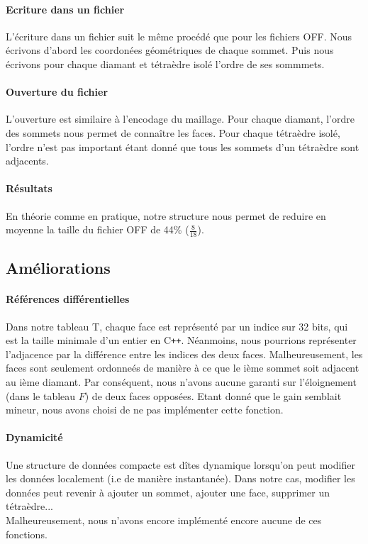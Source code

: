 \documentclass[a4paper,11pt,openany]{article}
\begin{document}
\paragraph{Ecriture dans un fichier}
L'écriture dans un fichier suit le même procédé que pour les fichiers OFF. Nous écrivons d'abord les coordonées géométriques de chaque sommet. Puis nous écrivons pour chaque diamant et tétraèdre isolé l'ordre de ses sommmets.

\paragraph{Ouverture du fichier}
L'ouverture est similaire à l'encodage du maillage. Pour chaque diamant, l'ordre des sommets nous permet de connaître les faces. Pour chaque tétraèdre isolé, l'ordre n'est pas important étant donné que tous les sommets d'un tétraèdre sont adjacents.

\paragraph{Résultats}
En théorie comme en pratique, notre structure nous permet de reduire en moyenne la taille du fichier OFF de 44\% ($\frac{8}{18}$).

\subsection{Améliorations}
\paragraph{Références différentielles}
Dans notre tableau T, chaque face est représenté par un indice sur 32 bits, qui est la taille minimale d'un entier en C\texttt{++}. Néanmoins, nous pourrions représenter l'adjacence par la différence entre les indices des deux faces. Malheureusement, les faces sont seulement ordonneés de manière à ce que le ième sommet soit adjacent au ième diamant. Par conséquent, nous n'avons aucune garanti sur l'éloignement (dans le tableau $F$) de deux faces opposées. Etant donné que le gain semblait mineur, nous avons choisi de ne pas implémenter cette fonction.

\paragraph{Dynamicité}
Une structure de données compacte est dîtes dynamique lorsqu'on peut modifier les données localement (i.e de manière instantanée). Dans notre cas, modifier les données peut revenir à ajouter un sommet, ajouter une face, supprimer un tétraèdre...\\
Malheureusement, nous n'avons encore implémenté encore aucune de ces fonctions.
\end{document}
